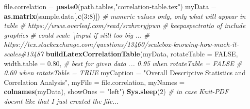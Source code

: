 \documentclass[]{article}
\newenvironment{Shaded}{\begin{snugshade}}{\end{snugshade}}
\newcommand{\CommentTok}[1]{\textcolor[rgb]{0.56,0.35,0.01}{\textit{#1}}}
\newcommand{\DataTypeTok}[1]{\textcolor[rgb]{0.13,0.29,0.53}{#1}}
\newcommand{\DecValTok}[1]{\textcolor[rgb]{0.00,0.00,0.81}{#1}}
\newcommand{\FloatTok}[1]{\textcolor[rgb]{0.00,0.00,0.81}{#1}}
\newcommand{\KeywordTok}[1]{\textcolor[rgb]{0.13,0.29,0.53}{\textbf{#1}}}
\newcommand{\NormalTok}[1]{#1}
\newcommand{\OperatorTok}[1]{\textcolor[rgb]{0.81,0.36,0.00}{\textbf{#1}}}
\newcommand{\OtherTok}[1]{\textcolor[rgb]{0.56,0.35,0.01}{#1}}
\newcommand{\StringTok}[1]{\textcolor[rgb]{0.31,0.60,0.02}{#1}}
\begin{document}
\begin{Shaded}
\begin{Highlighting}[]
\NormalTok{file.correlation =}\StringTok{ }\KeywordTok{paste0}\NormalTok{(path.tables,}\StringTok{"correlation{-}table.tex"}\NormalTok{)}
\NormalTok{myData =}\StringTok{ }\KeywordTok{as.matrix}\NormalTok{(sample.data[,}\KeywordTok{c}\NormalTok{(}\DecValTok{3}\OperatorTok{:}\DecValTok{8}\NormalTok{)])  }\CommentTok{\# numeric values only, only what will appear in table}
\CommentTok{\# https://www.overleaf.com/read/srzhrcryjpwn}
\CommentTok{\# keepaspectratio of include graphics }
\CommentTok{\# could scale \textbackslash{}input if still too big ...}
\CommentTok{\# https://tex.stackexchange.com/questions/13460/scalebox{-}knowing{-}how{-}much{-}it{-}scales\#13487}
\KeywordTok{buildLatexCorrelationTable}\NormalTok{(myData, }
  \DataTypeTok{rotateTable =} \OtherTok{FALSE}\NormalTok{,}
  \DataTypeTok{width.table =} \FloatTok{0.80}\NormalTok{, }\CommentTok{\# best for given data ... 0.95 when rotateTable = FALSE}
                      \CommentTok{\# 0.60 when rotateTable = TRUE}
  \DataTypeTok{myCaption =} \StringTok{"Overall Descriptive Statistics and Correlation Analysis"}\NormalTok{,}
  \DataTypeTok{myFile =}\NormalTok{ file.correlation,}
  \DataTypeTok{myNames =} \KeywordTok{colnames}\NormalTok{(myData),}
  \DataTypeTok{showOnes =} \StringTok{"left"}\NormalTok{)}
\KeywordTok{Sys.sleep}\NormalTok{(}\DecValTok{2}\NormalTok{) }\CommentTok{\# in case Knit{-}PDF doesn\textquotesingle{}t like that I just created the file...}
\end{Highlighting}
\end{Shaded}
\end{document}
